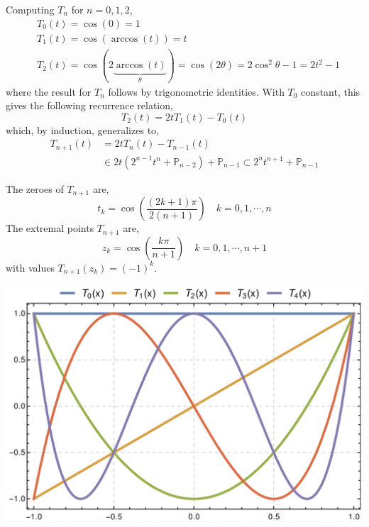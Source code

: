 \begin{rmk}
    Computing $T_n$ for $n = 0, 1, 2$,
    \begin{align*}
    &T_0(t)=\cos (0)=1 \\
    &T_1(t)=\cos (\arccos (t))=t \\
    &T_2(t)=\cos (2 \underbrace{\arccos (t)}_{\theta})=\cos (2 \theta)=2 \cos ^2 \theta-1=2 t^2-1
    \end{align*}
    where the result for $T_n$ follows by trigonometric identities. With $T_0$ constant, this gives the following recurrence relation,
    \[T_2(t)=2 t T_1(t)-T_0(t)\]
    which, by induction, generalizes to,
    \begin{align*}
    T_{n+1}(t) &=2 t T_n(t)-T_{n-1}(t) \\
    & \in 2 t\left(2^{n-1} t^n+\mathbb{P}_{n-2}\right)+\mathbb{P}_{n-1} \subset 2^n t^{n+1}+\mathbb{P}_{n-1}
    \end{align*}
\end{rmk}

\begin{rmk}
    The zeroes of $T_{n+1}$ are,
    \[t_k=\cos \left(\frac{(2 k+1) \pi}{2(n+1)}\right) \quad k = 0, 1, \cdots, n\]
    The extremal points $T_{n+1}$ are,
    \[z_k=\cos \left(\frac{k \pi}{n+1}\right)\quad k = 0, 1, \cdots, n+1\]
    with values $T_{n+1}\left(z_k\right)=(-1)^k$.
\end{rmk}

\begin{marginfigure}
\begin{center}
       \includegraphics[width=\textwidth]{figures/fig-5.png}
\end{center}
\end{marginfigure}

